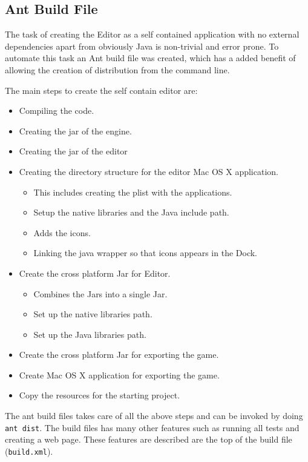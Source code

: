 \subsection{Ant Build File}

The task of creating the Editor as a self contained application with no external dependencies apart from obviously Java is non-trivial and error prone.  To automate this task an Ant build file was created, which has a added benefit of allowing the creation of distribution from the command line. 

The main steps to create the self contain editor are:
\begin{itemize}
	\item Compiling the code.
	\item Creating the jar of the engine.
	\item Creating the jar of the editor
	\item Creating the directory structure for the editor Mac OS X application.
	\begin{itemize}[topsep=0mm,noitemsep ]
		\item This includes creating the plist\cite{plist} with the applications.
		\item Setup the native libraries and the Java include path.
		\item Adds the icons.
		\item Linking the java wrapper so that icons appears in the Dock.
	\end{itemize}
	\item Create the cross platform Jar for Editor. 
	\begin{itemize}[topsep=0mm,noitemsep ]
		\item Combines the Jars into a single Jar.
		\item Set up the native libraries path.
		\item Set up the Java libraries path.
	\end{itemize}
	\item Create the cross platform Jar for exporting the game.
	\item Create Mac OS X application for exporting the game.
	\item Copy the resources for the starting project.
\end{itemize}

The ant build files takes care of all the above steps and can be invoked by doing \lstinline{ant dist}. The build files has many other features such as running all tests and creating a web page. These features are described are the top of the build file (\texttt{build.xml}).